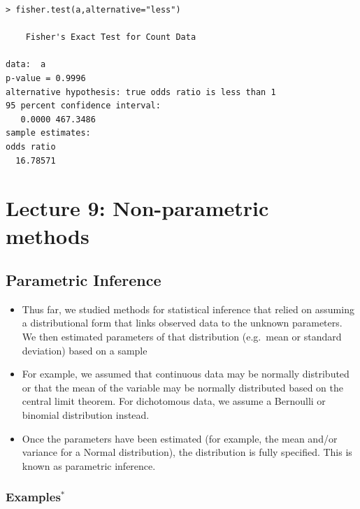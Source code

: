 \documentclass[
]{book}
\providecommand{\tightlist}{%
  \setlength{\itemsep}{0pt}\setlength{\parskip}{0pt}}
\begin{document}
\begin{verbatim}
> fisher.test(a,alternative="less")

    Fisher's Exact Test for Count Data

data:  a
p-value = 0.9996
alternative hypothesis: true odds ratio is less than 1
95 percent confidence interval:
   0.0000 467.3486
sample estimates:
odds ratio 
  16.78571 
\end{verbatim}

\hypertarget{lecture-9-non-parametric-methods}{%
\chapter{Lecture 9: Non-parametric methods}\label{lecture-9-non-parametric-methods}}

\hypertarget{parametric-inference}{%
\section{Parametric Inference}\label{parametric-inference}}

\begin{itemize}
\tightlist
\item
  Thus far, we studied methods for statistical inference that relied on assuming a distributional form that links observed data to the unknown parameters. We then estimated parameters of that distribution (e.g.~mean or standard deviation) based on a sample
\item
  For example, we assumed that continuous data may be normally distributed or that the mean of the variable may be normally distributed based on the central limit theorem. For dichotomous data, we assume a Bernoulli or binomial distribution instead.
\item
  Once the parameters have been estimated (for example, the mean and/or variance for a Normal distribution), the distribution is fully specified. This is known as parametric inference.
\end{itemize}

\hypertarget{examples}{%
\subsection{\texorpdfstring{Examples\(^*\)}{Examples\^{}*}}\label{examples}}
\end{document}
